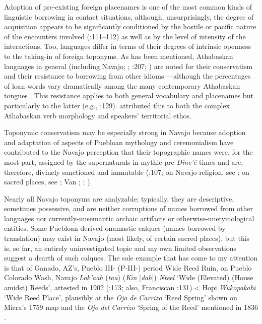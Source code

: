 Adoption of pre-existing foreign placenames is one of the most common kinds of linguistic borrowing in contact situations, although, unsurprisingly, the degree of acquisition appears to be significantly conditioned by the hostile or pacific nature of the encounters involved (\citealt{CallaghanGamble1996}:111–112) as well as by the level of intensity of the interactions.  Too, languages differ in terms of their degrees of intrinsic openness to the taking-in of foreign toponyms.  As has been mentioned, Athabaskan languages in general (including Navajo; \citealt{Mirkowich1941}; \citealt{Jett2001}:207; \citealt{Kari2011}) are noted for their conservatism and their resistance to borrowing from other idioms \citep[209]{Sapir1921}—although the percentages of loan words vary dramatically among the many contemporary Athabaskan tongues \citep[105]{Brown1994}.  This resistance applies to both general vocabulary and placenames but particularly to the latter (e.g., \citealt{Kari1989}:129).  \citet{Kari2010} attributed this to both the complex Athabaskan verb morphology and speakers’ territorial ethos.

Toponymic conservatism may be especially strong in Navajo because adoption and adaptation of aspects of Puebloan mythology and ceremonialism have contributed to the Navajo perception that their topographic names were, for the most part, assigned by the supernaturals in mythic pre-\textit{Dine’é} times and are, therefore, divinely sanctioned and immutable (\citealt{Jett2014}:107; on Navajo religion, see \citealt{Reichard1990}; on sacred places, see \citealt{Watson1964}; Van \citealt{Valkenburg1974}; \citealt{Jett1992}; \citealt{KelleyFrancis1994}).  

Nearly all Navajo toponyms are analyzable; typically, they are descriptive, sometimes possessive, and are neither corruptions of names borrowed from other languages nor currently-unsemantic archaic artifacts or otherwise-unetymological entities.  Some Puebloan-derived onamastic calques (names borrowed by translation) may exist in Navajo (most likely, of certain sacred places), but this is, so far, an entirely uninvestigated topic and my own limited observations suggest a dearth of such calques.  The sole example that has come to my attention is that of Ganado, AZ’s, Pueblo III- (P-III-) period Wide Reed Ruin, on Pueblo Colorado Wash, Navajo \textit{Lok’aah} (\textit{taa}) (\textit{Kin} [\textit{dah}]) \textit{Nteel} ‘Wide (Elevated) (House amidst) Reeds’, attested in 1902 (\citealt{Ostermann2004b}:173; also, Franciscan \citealt{Fathers1910}:131) < Hopi \textit{Wukopakabi} ‘Wide Reed Place’, plausibly at the \textit{Ojo} \textit{de} \textit{Carrizo} ‘Reed Spring’ shown on Miera’s 1759 map \citep[36]{Kessell2013} and the \textit{Ojo} \textit{del} \textit{Carrizo} ‘Spring of the Reed’ mentioned in 1836 \citep[159]{Correll1979}.

